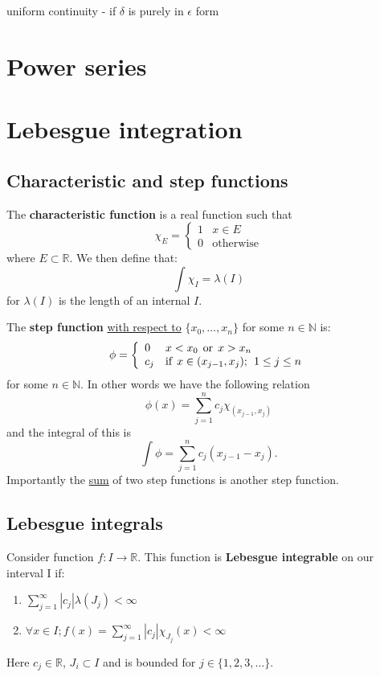 \documentclass{article}
\begin{document}
uniform continuity - if $\delta$ is purely in $\epsilon$ form

\newpage
  
\section{Power series}

\newpage

\section{Lebesgue integration}

\subsection{Characteristic and step functions}
The \textbf{characteristic function} is a real function such that
$$\chi_E =
\left\{
\begin{array}{ll}
	1  & \mbox{} x \in E \\
	0 & \mbox{otherwise}
\end{array}
\right.$$
where $E \subset \mathbb{R}$. We then define that:
$$\int \chi_{I} = \lambda(I)$$
for $\lambda(I)$ is the length of an internal $I$.

The \textbf{step function} \underline{with respect to} $\{x_0, \dots, x_n\}$
for some $n \in \mathbb{N}$ is:
$$\phi =
\left\{
\begin{array}{ll}
	0  &  x < x_0 \hspace{0.06in} \text{or} \hspace{0.06in} x > x_n \\
	c_j & \mbox{if} \hspace{0.06in} x \in (x_{j-1}, x_j); \hspace{0.06in} 1 \leq j \leq n
\end{array}
\right.$$
for some $n \in \mathbb{N}$. In other words we have the following relation
$$\phi(x) = \sum_{j=1}^{n} c_j \chi_{(x_{j-1}, x_j)}$$
and the integral of this is
$$\int \phi = \sum_{j=1}^{n} c_j (x_{j-1}-x_j).$$
Importantly the \underline{sum} of two step functions is another step function.
    
\newpage

\subsection{Lebesgue integrals}
Consider function $f:I \rightarrow \mathbb{R}$. This function is \textbf{Lebesgue integrable} on our interval I if:
\begin{enumerate}
    \item $\displaystyle\sum_{j=1}^{\infty} |c_j| \lambda(J_j) < \infty$

    \item $\forall x\in I; f(x)=\displaystyle\sum_{j=1}^{\infty} |c_j| \chi_{J_j}(x)<\infty$
\end{enumerate}
Here $c_j \in \mathbb{R}$, $J_i \subset I$ and is bounded for $j \in \{1, 2, 3, \dots\}$.
\end{document}
